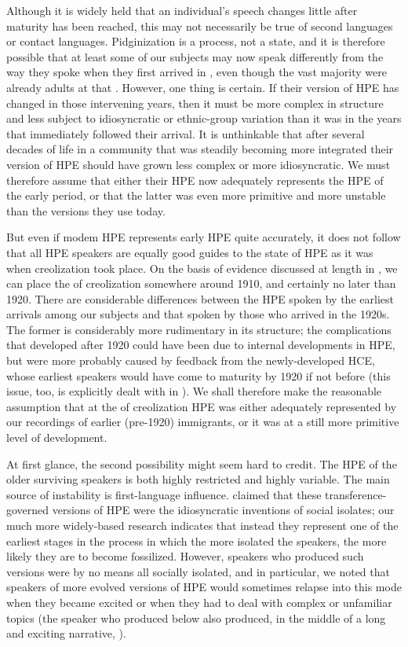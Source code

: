 Although it is widely held that an individual's speech changes little after maturity has been reached, this may not necessarily be true of second languages or contact languages. Pidginization is a process, not a state, and it is therefore possible that at least some of our subjects may now speak differently from the way they spoke when they first arrived in , even though the vast majority were already adults at that . However, one thing is certain. If their version of HPE has changed in those intervening years, then it must be more complex in structure and less subject to idiosyncratic or ethnic-group variation than it was in the years that immediately followed their arrival. It is unthinkable that after several decades of life in a community that was steadily becoming more integrated their version of HPE should have grown less complex or more idiosyncratic. We must therefore assume that either their HPE now adequately represents the HPE of the early  period, or that the latter was even more primitive and more unstable than the versions they use today.

But even if modem HPE represents early HPE quite accurately, it does not follow that all HPE speakers are equally good guides to the state of HPE as it was when creolization took place. On the basis of evidence discussed at length in \citet{Bickerton1977}, we can place the  of creolization somewhere around 1910, and certainly no later than 1920. There are considerable differences between the HPE spoken by
the earliest arrivals among our subjects and that spoken by those who arrived in the 1920s. The former is considerably more rudimentary in its structure; the complications that developed after 1920 could have been due to internal developments in HPE, but were more probably caused by feedback from the newly-developed HCE, whose earliest speakers would have come to maturity by 1920 if not before (this issue, too, is explicitly dealt with in \citealt[Chapter~4]{Bickerton1977}). We shall therefore make the reasonable assumption that at the  of creolization HPE was either adequately represented by our recordings of earlier (pre-1920) immigrants, or it was at a still more primitive level of development.

At first glance, the second possibility might seem hard to credit. The HPE of the older surviving speakers is both highly restricted and highly variable. The main source of instability is first-language influence. \citet{Labov1971} claimed that these transference-governed versions of HPE were the idiosyncratic inventions of social isolates; our much more widely-based research indicates that instead they represent one of the earliest stages in the  process in which the more isolated the speakers, the more likely they are to become fossilized. However, speakers who produced such versions were by no means all socially isolated, and in particular, we noted that speakers of more evolved versions of HPE would sometimes relapse into this mode when they became excited or when they had to deal with complex or unfamiliar topics (the speaker who produced  below also produced, in the middle of a long and exciting narrative, ).

